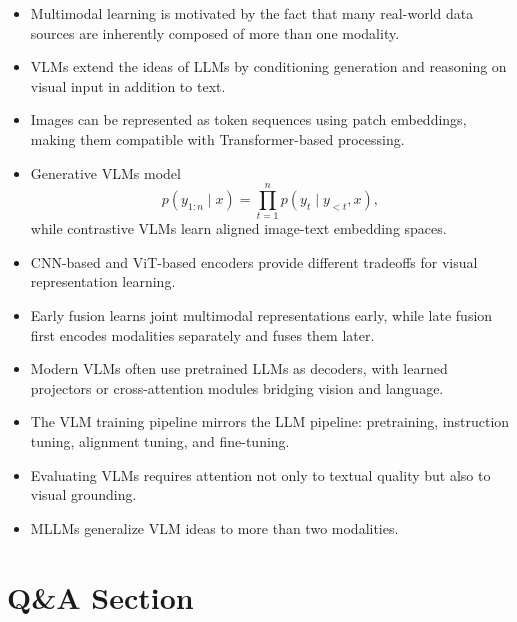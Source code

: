 \documentclass{article}
\begin{document}
\begin{itemize}
    \item Multimodal learning is motivated by the fact that many real-world data sources are inherently composed of more than one modality.
    \item VLMs extend the ideas of LLMs by conditioning generation and reasoning on visual input in addition to text.
    \item Images can be represented as token sequences using patch embeddings, making them compatible with Transformer-based processing.
    \item Generative VLMs model
    \[
    p(y_{1:n}\mid x)=\prod_{t=1}^{n} p(y_t\mid y_{<t},x),
    \]
    while contrastive VLMs learn aligned image-text embedding spaces.
    \item CNN-based and ViT-based encoders provide different tradeoffs for visual representation learning.
    \item Early fusion learns joint multimodal representations early, while late fusion first encodes modalities separately and fuses them later.
    \item Modern VLMs often use pretrained LLMs as decoders, with learned projectors or cross-attention modules bridging vision and language.
    \item The VLM training pipeline mirrors the LLM pipeline: pretraining, instruction tuning, alignment tuning, and fine-tuning.
    \item Evaluating VLMs requires attention not only to textual quality but also to visual grounding.
    \item MLLMs generalize VLM ideas to more than two modalities.
\end{itemize}


\section{Q\&A Section}
\end{document}
